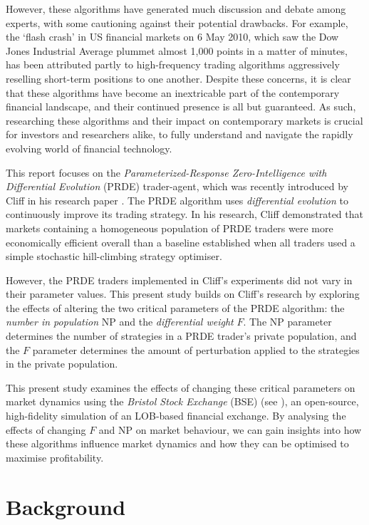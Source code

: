 \documentclass[conference]{IEEEtran}
\begin{document}
However, these algorithms have generated much discussion and debate among experts, with some cautioning against their potential drawbacks.
For example, the `flash crash' in US financial markets on 6 May 2010, which saw the Dow Jones Industrial Average plummet almost 1,000 points in a matter of minutes, has been attributed partly to high-frequency trading algorithms aggressively reselling short-term positions to one another.
Despite these concerns, it is clear that these algorithms have become an inextricable part of the contemporary financial landscape, and their continued presence is all but guaranteed.
As such, researching these algorithms and their impact on contemporary markets is crucial for investors and researchers alike, to fully understand and navigate the rapidly evolving world of financial technology.

This report focuses on the \textit{Parameterized-Response Zero-Intelligence with Differential Evolution} (PRDE) trader-agent, which was recently introduced by Cliff in his research paper \cite{PRDE}.
The PRDE algorithm uses \textit{differential evolution} \cite{StornPrice} to continuously improve its trading strategy.
In his research, Cliff demonstrated that markets containing a homogeneous population of PRDE traders were more economically efficient overall than a baseline established when all traders used a simple stochastic hill-climbing strategy optimiser.

However, the PRDE traders implemented in Cliff's experiments did not vary in their parameter values.
This present study builds on Cliff's research by exploring the effects of altering the two critical parameters of the PRDE algorithm: the \textit{number in population} $\mathrm{NP}$ and the \textit{differential weight} $F$.
The $\mathrm{NP}$ parameter determines the number of strategies in a PRDE trader's private population, and the $F$ parameter determines the amount of perturbation applied to the strategies in the private population.

This present study examines the effects of changing these critical parameters on market dynamics using the \textit{Bristol Stock Exchange} (BSE) (see \cite{BSE, BSEPaper}), an open-source, high-fidelity simulation of an LOB-based financial exchange.
By analysing the effects of changing $F$ and $\mathrm{NP}$ on market behaviour, we can gain insights into how these algorithms influence market dynamics and how they can be optimised to maximise profitability.

\section{Background}
\end{document}
